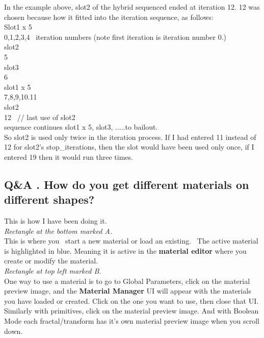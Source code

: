 In the example above, slot2 of the hybrid sequenced ended at iteration
12. 12 was chosen because how it fitted into the iteration sequence, as
follows:\\[2\baselineskip]Slot1 x 5\\
0,1,2,3,4~ iteration numbers (note first iteration is iteration number
0.)\\[2\baselineskip]slot2\\
5\\[2\baselineskip]slot3~\\
6\\[2\baselineskip]slot1 x 5\\
7,8,9,10.11\\[2\baselineskip]slot2\\
12~ // last use of slot2\\[2\baselineskip]\hspace*{0.333em}sequence
continues slot1 x 5, slot3, .....to bailout.\\[2\baselineskip]So slot2
is used only twice in the iteration process. If I had entered 11 instead
of 12 for slot2's stop\_iterations, then the slot would have been used
only once, if I entered 19 then it would run three times.

\subsection{Q\&A . How do you get different materials on different
shapes?}\label{qa-.-how-do-you-get-different-materials-on-different-shapes}

This is how I have been doing it.\\[2\baselineskip]\emph{Rectangle at
the bottom marked A.}\\[2\baselineskip]This is where you~ start a new
material or load an existing.~ The active material is highlighted in
blue. Meaning it is active in the \textbf{material editor} where you
create or modify the material.\\[2\baselineskip]\emph{Rectangle at top
left marked B.}\\[2\baselineskip]One way to use a material is to go to
Global Parameters, click on the material preview image, and the
\textbf{Material Manager} UI will appear with the materials you have
loaded or created. Click on the one you want to use, then close that
UI.\\
Similarly with primitives, click on the material preview image. And with
Boolean Mode each fractal/transform has it's own material preview image
when you scroll down.

